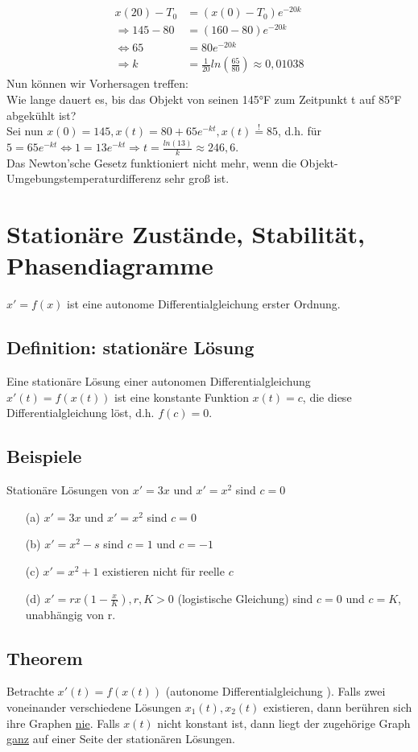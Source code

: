 \documentclass[12pt,a4paper]{article}
\newcommand{\DGL}{Differentialgleichung }
\begin{document}
\begin{align*}
x(20) - T_0 &= (x(0)-T_0)e^{-20k} \\
\Rightarrow 145-80&=(160-80)e^{-20k} \\
\Leftrightarrow 65 &= 80e^{-20k} \\
\Rightarrow k&=\frac{1}{20} ln(\frac{65}{80}) \approx 0,01038
\end{align*}
Nun können wir Vorhersagen treffen: \\
Wie lange dauert es, bis das Objekt von seinen 145°F zum Zeitpunkt t auf 85°F abgekühlt ist? \\
Sei nun $x(0) = 145, x(t) = 80+65e^{-kt}, x(t) \overset{!}{=} 85$, d.h. für $5=65e^{-kt} \Leftrightarrow 1=13e^{-kt} \Rightarrow t = \frac{ln(13)}{k} \approx 246,6.$ \\
Das Newton'sche Gesetz funktioniert nicht mehr, wenn die Objekt-Umgebungstemperaturdifferenz sehr groß ist.
\section{Stationäre Zustände, Stabilität, Phasendiagramme}
$x'=f(x)$ ist eine autonome \DGL erster Ordnung.
\subsection{Definition: stationäre Lösung}
Eine stationäre Lösung einer autonomen \DGL $x'(t) = f(x(t))$ ist eine konstante Funktion $x(t) = c$, die diese \DGL löst, d.h. $f(c) = 0$.
\subsection{Beispiele}
Stationäre Lösungen von $x'=3x$ und $x'=x^2$ sind $c=0$
\begin{itemize}
\item[(a)] $x'=3x$ und $x'=x^2$ sind $c=0$
\item[(b)] $x'=x^2-s$ sind $c=1$ und $c=-1$
\item[(c)] $x'=x^2+1$ existieren nicht für reelle $c$
\item[(d)] $x'=rx(1-\frac{x}{K}), r,K > 0$ (logistische Gleichung) sind $c=0$ und $c=K$, unabhängig von r.
\end{itemize}
\subsection{Theorem}
Betrachte $x'(t) = f(x(t))$ (autonome \DGL). Falls zwei voneinander verschiedene Lösungen $x_1(t), x_2(t)$ existieren, dann berühren sich ihre Graphen \underline{nie}. Falls $x(t)$ nicht konstant ist, dann liegt der zugehörige Graph \underline{ganz} auf einer Seite der stationären Lösungen.
\end{document}
